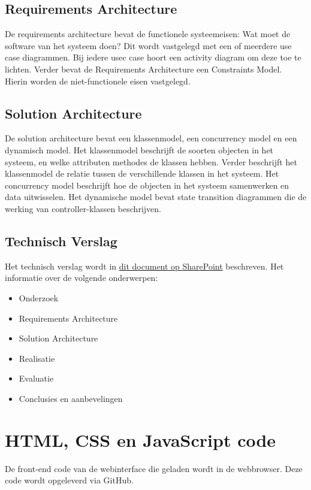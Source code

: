 \subsection{Requirements Architecture}
De requirements architecture bevat de functionele systeemeisen: Wat moet de software van het systeem doen? Dit wordt vastgelegd met een of meerdere use case diagrammen. Bij iedere usec case hoort een activity diagram om deze toe te lichten. Verder bevat de Requirements Architecture een Constraints Model. Hierin worden de niet-functionele eisen vastgelegd. 

\subsection{Solution Architecture}
De solution architecture bevat een klassenmodel, een concurrency model en een dynamisch model. Het klassenmodel beschrijft de soorten objecten in het systeem, en welke attributen methodes de klassen hebben. Verder beschrijft het klassenmodel de relatie tussen de verschillende klassen in het systeem. Het concurrency model beschrijft hoe de objecten in het systeem samenwerken en data uitwisselen. Het dynamische model bevat state transition diagrammen die de werking van controller-klassen beschrijven.

\subsection{Technisch Verslag}
Het technisch verslag wordt in \href{https://cursussen.sharepoint.hu.nl/fnt/35/TCTI-V2THO6-14/Studiemateriaal/Inhoud%20Technisch%20Verslag%20themaopdracht%20Domotica.pdf}{dit document op SharePoint} beschreven. Het informatie over de volgende onderwerpen:
\begin{itemize}
	\item Onderzoek
	\item Requirements Architecture
	\item Solution Architecture
	\item Realisatie
	\item Evaluatie
	\item Conclusies en aanbevelingen
\end{itemize}

\section{HTML, CSS en JavaScript code}
De front-end code van de webinterface die geladen wordt in de webbrowser. Deze code wordt opgeleverd via GitHub.


